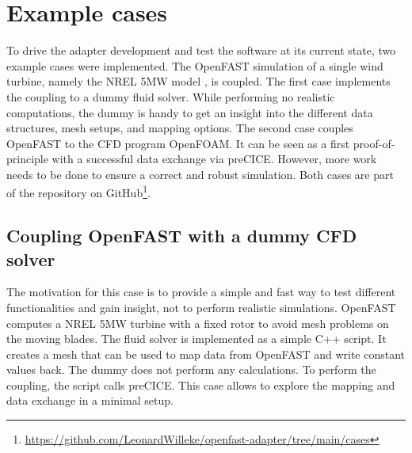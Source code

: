 \section{Example cases}
\label{section:cases}

To drive the adapter development and test the software at its current state, two example cases were implemented. The OpenFAST simulation of a single wind turbine, namely the NREL 5MW model \cite{Jonkman:2009}, is coupled. The first case implements the coupling to a dummy fluid solver. While performing no realistic computations, the dummy is handy to get an insight into the different data structures, mesh setups, and mapping options. The second case couples OpenFAST to the CFD program OpenFOAM. It can be seen as a first proof-of-principle with a successful data exchange via preCICE. However, more work needs to be done to ensure a correct and robust simulation. Both cases are part of the repository on GitHub\footnote{\url{https://github.com/LeonardWilleke/openfast-adapter/tree/main/cases}}.

\subsection{Coupling OpenFAST with a dummy CFD solver}

The motivation for this case is to provide a simple and fast way to test different functionalities and gain insight, not to perform realistic simulations. OpenFAST computes a NREL 5MW turbine with a fixed rotor to avoid mesh problems on the moving blades. The fluid solver is implemented as a simple C++ script. It creates a mesh that can be used to map data from OpenFAST and write constant values back. The dummy does not perform any calculations. To perform the coupling, the script calls preCICE. This case allows to explore the mapping and data exchange in a minimal setup.

